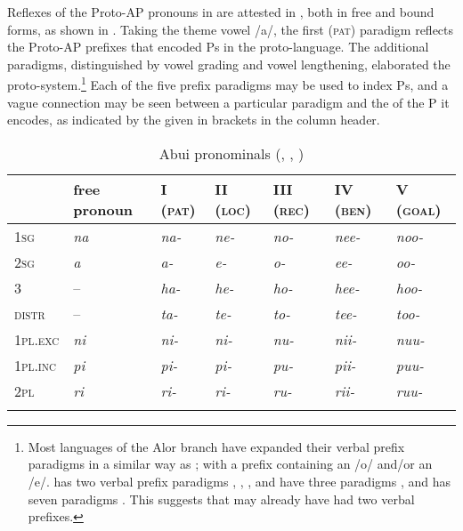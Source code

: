 \documentclass[output=paper]{LSP/langsci}
\begin{document}
Reflexes of the Proto-AP pronouns in  are attested in ,
both in free and bound forms, as shown in . Taking the theme vowel /a/, the first (\textsc{pat}) paradigm reflects the Proto-AP prefixes that encoded Ps in the proto-language. The additional paradigms, distinguished by vowel grading and vowel lengthening, elaborated the proto-system.\footnote{Most languages of the Alor branch have expanded their verbal prefix paradigms in a similar way as ; with a prefix containing an /o/ and/or an /e/.  has two verbal prefix paradigms \citep{Kratochvil2014Sawila}, , , and  have three paradigms \citep{Haan2001Grammar,Baird2008Grammar,Robinsonetal2014Adang,Schapperetal2017Relatedness}, and  has seven paradigms \citep{Schapper2014Kamang}. This suggests that  may already have had two verbal prefixes.} Each of the five prefix paradigms may be used to index Ps, and a vague connection may be seen between a particular paradigm and the  of the P it encodes, as indicated by the  given in brackets in the column header.

\begin{table}[t]
\caption{Abui pronominals (\citealt[78]{Kratochvil2007Grammar}, \citeyear[591]{Kratochvil2011Transitivity}, \citeyear[555]{Kratochvil2014Differential})}
\begin{tabularx}{\textwidth}{ l Q l l Q Q l }
\lsptoprule
& free pronoun & I (\textsc{pat}) & II (\textsc{loc}) & III (\textsc{rec}) & IV (\textsc{ben}) & V (\textsc{goal})\\\midrule

1\textsc{sg} & \textit{na} & \textit{na-} & \textit{ne-} & \textit{no-} & \textit{nee-} & \textit{noo-}\\

2\textsc{sg} & \textit{a} & \textit{a-} & \textit{e-} & \textit{o-} & \textit{ee-} & \textit{oo-}\\

3 & -- & \textit{ha-} & \textit{he-} & \textit{ho-} & \textit{hee-} & \textit{hoo-}\\

\textsc{distr} & -- & \textit{ta-} & \textit{te-} & \textit{to-} & \textit{tee-} & \textit{too-}\\

1\textsc{pl.exc} & \textit{ni} & \textit{ni-} & \textit{ni-} & \textit{nu-} & \textit{nii-} & \textit{nuu-}\\

1\textsc{pl.inc} & \textit{pi} & \textit{pi-} & \textit{pi-} & \textit{pu-} & \textit{pii-} & \textit{puu-}\\

2\textsc{pl} & \textit{ri} & \textit{ri-} & \textit{ri-} & \textit{ru-} & \textit{rii-} & \textit{ruu-}\\
\lspbottomrule
\end{tabularx}
\label{03-kl-tab:5}
\end{table}
\end{document}
